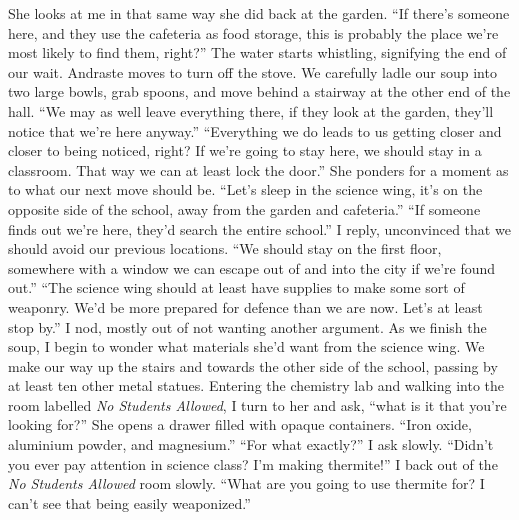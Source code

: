 \documentclass[a4paper, 12pt]{book}
\newcommand\tab[1][1cm]{\hspace*{#1}}
\begin{document}
\newline
\tab
She looks at me in that same way she did back at the garden. ``If there’s someone here, and they use the cafeteria as food storage, this is probably the place we’re most likely to find them, right?'' The water starts whistling, signifying the end of our wait. Andraste moves to turn off the stove. We carefully ladle our soup into two large bowls, grab spoons, and move behind a stairway at the other end of the hall. ``We may as well leave everything there, if they look at the garden, they’ll notice that we’re here anyway.''
\newline
\tab
``Everything we do leads to us getting closer and closer to being noticed, right? If we’re going to stay here, we should stay in a classroom. That way we can at least lock the door.''
\newline
\tab
She ponders for a moment as to what our next move should be. ``Let’s sleep in the science wing, it’s on the opposite side of the school, away from the garden and cafeteria.''
\newline
\tab
``If someone finds out we’re here, they’d search the entire school.'' I reply, unconvinced that we should avoid our previous locations. ``We should stay on the first floor, somewhere with a window we can escape out of and into the city if we’re found out.''
\newline
\tab
``The science wing should at least have supplies to make some sort of weaponry. We’d be more prepared for defence than we are now. Let’s at least stop by.'' I nod, mostly out of not wanting another argument. As we finish the soup, I begin to wonder what materials she’d want from the science wing. We make our way up the stairs and towards the other side of the school, passing by at least ten other metal statues. Entering the chemistry lab and walking into the room labelled \textit{No Students Allowed}, I turn to her and ask, ``what is it that you’re looking for?''
\newline
\tab
She opens a drawer filled with opaque containers. ``Iron oxide, aluminium powder, and magnesium.'' 
\newline
\tab
``For what exactly?'' I ask slowly.
\newline
\tab
``Didn’t you ever pay attention in science class? I’m making thermite!''
\newline
\tab
I back out of the \textit{No Students Allowed} room slowly. ``What are you going to use thermite for? I can’t see that being easily weaponized.''
\newline
\end{document}
